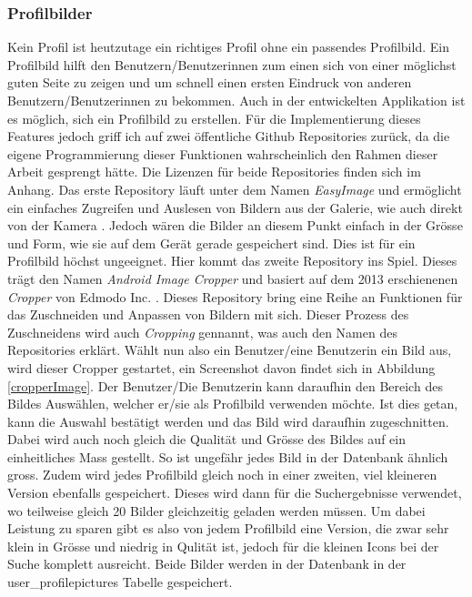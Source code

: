 \documentclass[a4paper,11pt]{report}
\begin{document}
		\subsubsection{Profilbilder}\label{profilePictures}
		Kein Profil ist heutzutage ein richtiges Profil ohne ein passendes Profilbild. Ein Profilbild hilft den Benutzern/Benutzerinnen zum einen sich von einer möglichst guten Seite zu zeigen und um schnell einen ersten Eindruck von anderen Benutzern/Benutzerinnen zu bekommen. Auch in der entwickelten Applikation ist es möglich, sich ein Profilbild zu erstellen. Für die Implementierung dieses Features jedoch griff ich auf zwei öffentliche Github Repositories zurück, da die eigene Programmierung dieser Funktionen wahrscheinlich den Rahmen dieser Arbeit gesprengt hätte. Die Lizenzen für beide Repositories finden sich im Anhang. Das erste Repository läuft unter dem Namen \emph{EasyImage} und ermöglicht ein einfaches Zugreifen und Auslesen von Bildern aus der Galerie, wie auch direkt von der Kamera \cite{EasyImage}. Jedoch wären die Bilder an diesem Punkt einfach in der Grösse und Form, wie sie auf dem Gerät gerade gespeichert sind. Dies ist für ein Profilbild höchst ungeeignet. Hier kommt das zweite Repository ins Spiel. Dieses trägt den Namen \emph{Android Image Cropper} und basiert auf dem 2013 erschienenen \emph{Cropper} von Edmodo Inc. \cite{Cropper} \cite{edmodo}. Dieses Repository bring eine Reihe an Funktionen für das Zuschneiden und Anpassen von Bildern mit sich. Dieser Prozess des Zuschneidens wird auch \emph{Cropping} gennannt, was auch den Namen des Repositories erklärt. Wählt nun also ein Benutzer/eine Benutzerin ein Bild aus, wird dieser Cropper gestartet, ein Screenshot davon findet sich in Abbildung \ref{cropperImage}. Der Benutzer/Die Benutzerin kann daraufhin den Bereich des Bildes Auswählen, welcher er/sie als Profilbild verwenden möchte. Ist dies getan, kann die Auswahl bestätigt werden und das Bild wird daraufhin zugeschnitten. Dabei wird auch noch gleich die Qualität und Grösse des Bildes auf ein einheitliches Mass gestellt. So ist ungefähr jedes Bild in der Datenbank ähnlich gross. Zudem wird jedes Profilbild gleich noch in einer zweiten, viel kleineren Version ebenfalls gespeichert. Dieses wird dann für die Suchergebnisse verwendet, wo teilweise gleich 20 Bilder gleichzeitig geladen werden müssen. Um dabei Leistung zu sparen gibt es also von jedem Profilbild eine Version, die zwar sehr klein in Grösse und niedrig in Qulität ist, jedoch für die kleinen Icons bei der Suche komplett ausreicht. Beide Bilder werden in der Datenbank in der user\_profilepictures Tabelle gespeichert.
		
\end{document}
